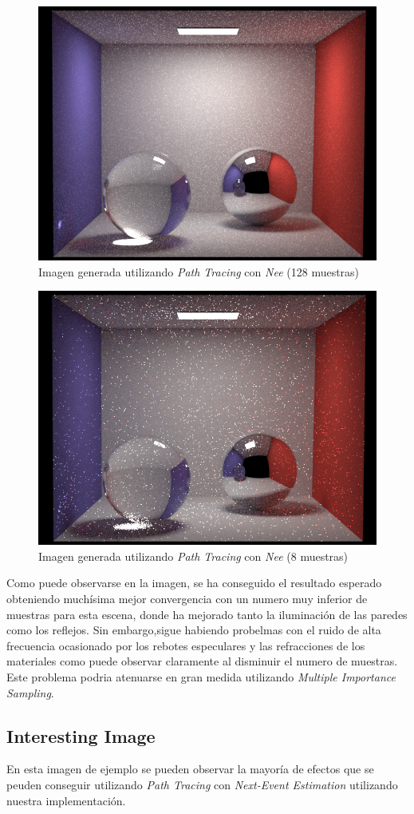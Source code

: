 \documentclass[10pt,oneside,a4paper]{article}
\begin{document}
\begin{figure}[h]
\centering
\includegraphics[width=.6\linewidth]{images/cbox_pathNee_128.png}
\caption{Imagen generada utilizando \textit{Path Tracing} con \textit{Nee} (128 muestras)}
\label{fig:disp}
\end{figure}

\begin{figure}[h]
\centering
\includegraphics[width=.6\linewidth]{images/cbox_pathNee_8.png}
\caption{Imagen generada utilizando \textit{Path Tracing} con \textit{Nee} (8 muestras)}
\label{fig:disp}
\end{figure}

Como puede observarse en la imagen, se ha conseguido el resultado esperado obteniendo muchísima mejor convergencia con un numero muy inferior de muestras para esta escena, donde ha mejorado tanto la iluminación de las paredes como los reflejos. Sin embargo,sigue habiendo probelmas con el ruido de alta frecuencia ocasionado por los rebotes especulares y las refracciones de los materiales como puede observar claramente al disminuir el numero de muestras. Este problema podria atenuarse en gran medida utilizando \textit{Multiple Importance Sampling}.\\
 \subsection{Interesting Image}
En esta imagen de ejemplo se pueden observar la mayoría de efectos que se peuden conseguir utilizando \textit{Path Tracing} con \textit{Next-Event Estimation} utilizando nuestra implementación.\\
\end{document}
